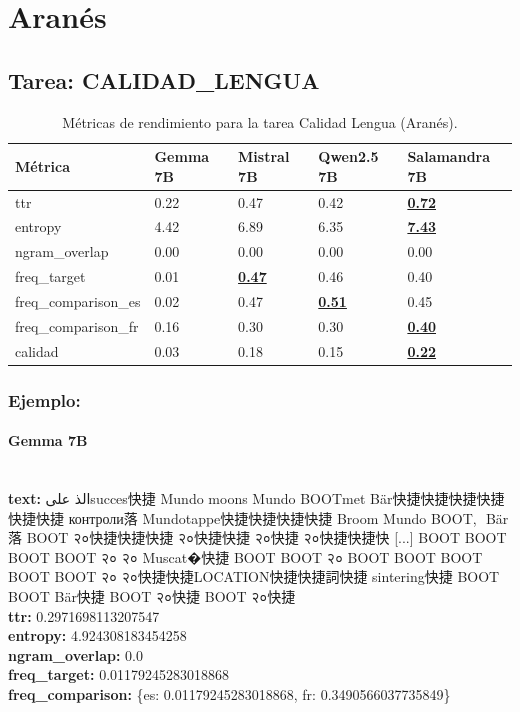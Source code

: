 \section{Aranés}

\subsection{Tarea: CALIDAD\_LENGUA}\label{tarea-calidad_lengua}
\begin{longtable}[]{@{}lllll@{}}
\toprule\noalign{}
Métrica & Gemma 7B & Mistral 7B & Qwen2.5 7B & Salamandra 7B \\
\midrule\noalign{}
\endhead
\bottomrule\noalign{}
\caption{Métricas de rendimiento para la tarea Calidad Lengua (Aranés).}
\label{tab:metricas_calidad_lengua_Aranés}
\endlastfoot
ttr & 0.22 & 0.47 & 0.42 & \textbf{\underline{0.72}} \\
entropy & 4.42 & 6.89 & 6.35 & \textbf{\underline{7.43}} \\
ngram\_overlap & 0.00 & 0.00 & 0.00 & 0.00 \\
freq\_target & 0.01 & \textbf{\underline{0.47}} & 0.46 & 0.40 \\
freq\_comparison\_es & 0.02 & 0.47 & \textbf{\underline{0.51}} & 0.45 \\
freq\_comparison\_fr & 0.16 & 0.30 & 0.30 & \textbf{\underline{0.40}} \\
calidad & 0.03 & 0.18 & 0.15 & \textbf{\underline{0.22}} \\
\end{longtable}

\subsubsection{Ejemplo:}

\paragraph{Gemma 7B}~\\
\textbf{text:} الذ علىsucces快捷 Mundo moons Mundo BOOTmet Bär快捷快捷快捷快捷快捷快捷 контроли落 Mundotappe快捷快捷快捷快捷 Broom Mundo BOOT,\,\ Bär落 BOOT २०快捷快捷快捷 २०快捷快捷 २०快捷 २०快捷快捷快 [...] BOOT BOOT BOOT BOOT २० २० Muscat�快捷 BOOT BOOT २० BOOT BOOT BOOT BOOT BOOT २० २०快捷快捷LOCATION快捷快捷詞快捷 sintering快捷 BOOT BOOT Bär快捷 BOOT २०快捷 BOOT २०快捷\\
\textbf{ttr:} 0.2971698113207547\\
\textbf{entropy:} 4.924308183454258\\
\textbf{ngram\_overlap:} 0.0\\
\textbf{freq\_target:} 0.01179245283018868\\
\textbf{freq\_comparison:} \{\textquotesingle{}es\textquotesingle{}: 0.01179245283018868, \textquotesingle{}fr\textquotesingle{}: 0.3490566037735849\}

